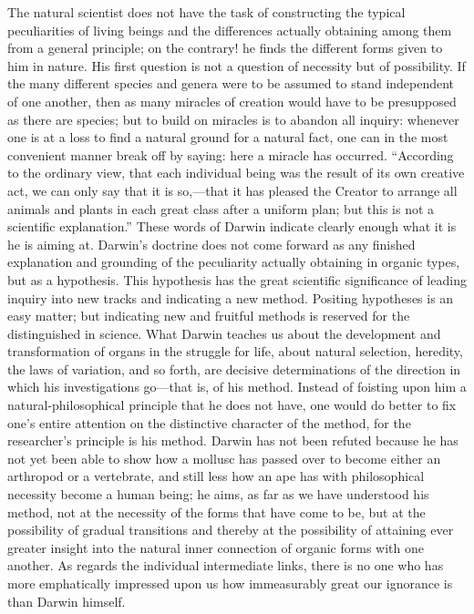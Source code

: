 \documentclass[12pt,a4paper]{article}
\begin{document}
The natural scientist does
not have the task of constructing the typical peculiarities of living
beings and the differences actually obtaining among them from a
general principle; on the contrary! he finds the different forms given
to him in nature. His first question is not a question of necessity
but of possibility. If the many different species and genera were to
be assumed to stand independent of one another, then as many miracles
of creation would have to be presupposed as there are species; but to
build on miracles is to abandon all inquiry: whenever one is at a
loss to find a natural ground for a natural fact, one can in the most
convenient manner break off by saying: here a miracle has occurred.
``According to the ordinary view, that each individual being was the
result of its own creative act, we can only say that it is so,---that
it has pleased the Creator to arrange all animals and plants in each
great class after a uniform plan; but this is not a scientific
explanation.''
These words of Darwin indicate clearly enough what it is he is aiming
at. Darwin's doctrine does not come forward as any finished
explanation and grounding of the peculiarity actually obtaining in
organic types, but as a hypothesis. This hypothesis has the great
scientific significance of leading inquiry into new tracks and
indicating a new method. Positing hypotheses is an easy matter; but
indicating new and fruitful methods is reserved for the
distinguished in science. What Darwin teaches us about the development
and transformation of organs in the struggle for life, about natural
selection, heredity, the laws of variation, and so forth, are decisive
determinations of the direction in which his investigations go---that
is, of his method. Instead of foisting upon him a natural-philosophical
principle that he does not have, one would do better to fix one's
entire attention on the distinctive character of the method, for the
researcher's principle is his method.
Darwin has not been refuted because he has not yet been able to show
how a mollusc has passed over to become either an arthropod or a
vertebrate, and still less how an ape has with philosophical necessity
become a human being; he aims, as far as we have understood his
method, not at the necessity of the forms that have come to be, but
at the possibility of gradual transitions and thereby at the
possibility of attaining ever greater insight into the natural inner
connection of organic forms with one another. As regards the
individual intermediate links, there is no one who has more
emphatically impressed upon us how immeasurably great our ignorance is
than Darwin himself.
\end{document}
